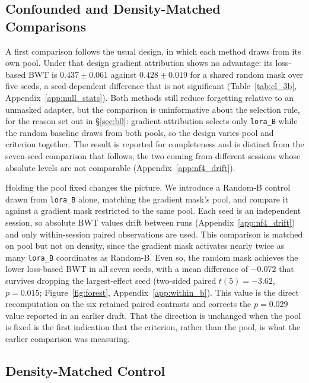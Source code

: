 \subsection{Confounded and Density-Matched Comparisons}
\label{sec:confounded}


A first comparison follows the usual design, in which each method draws from its own pool. Under that design gradient attribution shows no advantage: its loss-based BWT is $0.437 \pm 0.061$ against $0.428 \pm 0.019$ for a shared random mask over five seeds, a seed-dependent difference that is not significant (Table~\ref{tab:cl_3b}, Appendix~\ref{app:null_stats}). Both methods still reduce forgetting relative to an unmasked adapter, but the comparison is uninformative about the selection rule, for the reason set out in \S\ref{sec:b0}: gradient attribution selects only \texttt{lora\_B} while the random baseline draws from both pools, so the design varies pool and criterion together. The result is reported for completeness and is distinct from the seven-seed comparison that follows, the two coming from different sessions whose absolute levels are not comparable (Appendix~\ref{app:nf4_drift}).



Holding the pool fixed changes the picture. We introduce a Random-B control drawn from \texttt{lora\_B} alone, matching the gradient mask's pool, and compare it against a gradient mask restricted to the same pool. Each seed is an independent session, so absolute BWT values drift between runs (Appendix~\ref{app:nf4_drift}) and only within-session paired observations are used. This comparison is matched on pool but not on density, since the gradient mask activates nearly twice as many \texttt{lora\_B} coordinates as Random-B. Even so, the random mask achieves the lower loss-based BWT in all seven seeds, with a mean difference of $-0.072$ that survives dropping the largest-effect seed (two-sided paired $t(5)=-3.62$, $p = 0.015$; Figure~\ref{fig:forest}, Appendix~\ref{app:within_b}). This value is the direct recomputation on the six retained paired contrasts and corrects the $p=0.029$ value reported in an earlier draft. That the direction is unchanged when the pool is fixed is the first indication that the criterion, rather than the pool, is what the earlier comparison was measuring.



\subsection{Density-Matched Control}
\label{sec:d1}

